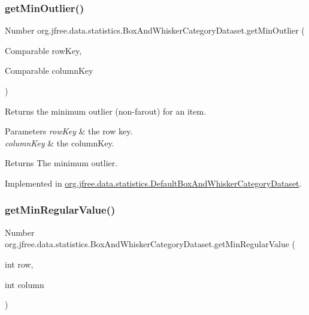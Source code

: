 \subsubsection{\texorpdfstring{get\+Min\+Outlier()}{getMinOutlier()}\hspace{0.1cm}{\footnotesize\ttfamily [2/2]}}
{\footnotesize\ttfamily Number org.\+jfree.\+data.\+statistics.\+Box\+And\+Whisker\+Category\+Dataset.\+get\+Min\+Outlier (\begin{DoxyParamCaption}\item[{Comparable}]{row\+Key,  }\item[{Comparable}]{column\+Key }\end{DoxyParamCaption})}

Returns the minimum outlier (non-\/farout) for an item.


\begin{DoxyParams}{Parameters}
{\em row\+Key} & the row key. \\
\hline
{\em column\+Key} & the column\+Key.\\
\hline
\end{DoxyParams}
\begin{DoxyReturn}{Returns}
The minimum outlier. 
\end{DoxyReturn}


Implemented in \mbox{\hyperlink{classorg_1_1jfree_1_1data_1_1statistics_1_1_default_box_and_whisker_category_dataset_a58596fb253f18d48239573568d9d4393}{org.\+jfree.\+data.\+statistics.\+Default\+Box\+And\+Whisker\+Category\+Dataset}}.

\mbox{\label{interfaceorg_1_1jfree_1_1data_1_1statistics_1_1_box_and_whisker_category_dataset_a1f8c01c076b3119bc284d9018f673fda}} 
\subsubsection{\texorpdfstring{get\+Min\+Regular\+Value()}{getMinRegularValue()}\hspace{0.1cm}{\footnotesize\ttfamily [1/2]}}
{\footnotesize\ttfamily Number org.\+jfree.\+data.\+statistics.\+Box\+And\+Whisker\+Category\+Dataset.\+get\+Min\+Regular\+Value (\begin{DoxyParamCaption}\item[{int}]{row,  }\item[{int}]{column }\end{DoxyParamCaption})}

